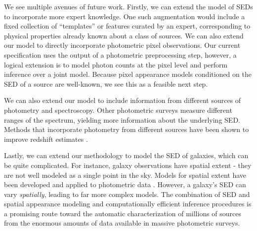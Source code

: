 \documentclass{article}
\begin{document}
We see multiple avenues of future work.  Firstly, we can extend the model of SEDs to incorporate more expert knowledge.  One such augmentation would include a fixed collection of ``templates'' or features curated by an expert, corresponding to physical properties already known about a class of sources.  
We can also extend our model to directly incorporate photometric pixel observations. Our current specification uses the output of a photometric preprocessing step, however, a logical extension is to model photon counts at the pixel level and perform inference over a joint model. 
Because pixel appearance models conditioned on the SED of a source are well-known, we see this as a feasible next step. 

We can also extend our model to include information from different sources of photometry and spectroscopy.  Other photometric surveys measure different ranges of the spectrum, yielding more information about the underlying SED.  Methods that incorporate photometry from different sources have been shown to improve redshift estimates \cite{brescia2013photometric}.  

Lastly, we can extend our methodology to model the SED of galaxies, which can be quite complicated.  For instance, galaxy observations have spatial extent - they are not well modeled as a single point in the sky.  
Models for spatial extent have been developed and applied to photometric data \cite{hogg2013replacing, regier2015}.  
However, a galaxy's SED can vary \emph{spatially}, leading to far more complex models.    
The combination of SED and spatial appearance modeling and computationally efficient inference procedures is a promising route toward the automatic characterization of millions of sources from the enormous amounts of data available in massive photometric surveys.  

 



\clearpage


\end{document}
